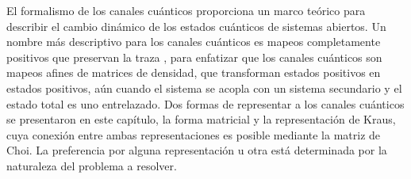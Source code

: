 El formalismo de los canales cuánticos proporciona un marco 
teórico para describir el cambio dinámico de los estados cuánticos 
de sistemas abiertos. Un nombre más descriptivo para 
los canales cuánticos es mapeos completamente 
positivos que preservan la traza \cite{bengtsson_zyczkowski_2017},
para enfatizar que los canales cuánticos son mapeos afines de matrices de 
densidad, que transforman estados positivos en estados positivos,
aún cuando el sistema se acopla con un sistema secundario y el estado
total es uno entrelazado. 
Dos formas de representar a los canales cuánticos
se presentaron en este capítulo, la forma matricial y 
la representación de Kraus, cuya conexión entre ambas representaciones
es posible mediante la matriz de Choi.
La preferencia por alguna representación u otra está determinada 
por la naturaleza del problema a resolver. 
